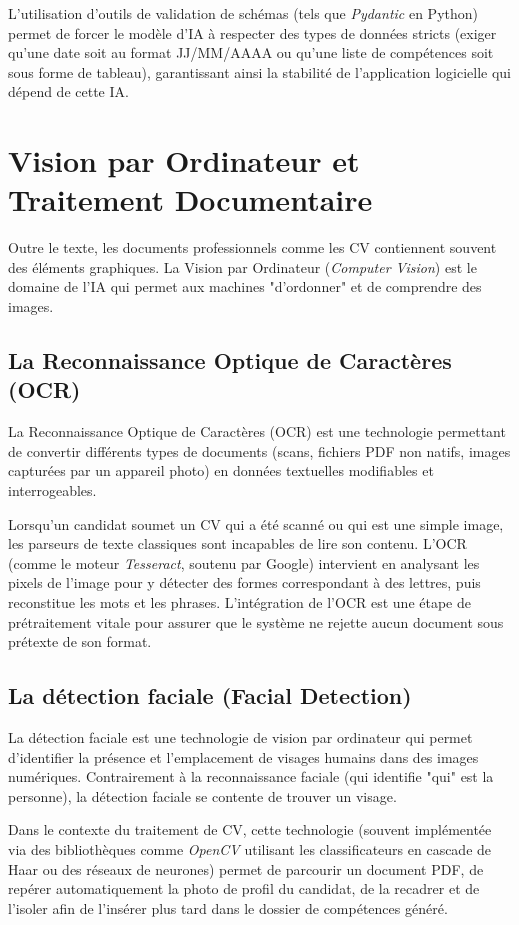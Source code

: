 L'utilisation d'outils de validation de schémas (tels que \textit{Pydantic} en Python) permet de forcer le modèle d'IA à respecter des types de données stricts (exiger qu'une date soit au format JJ/MM/AAAA ou qu'une liste de compétences soit sous forme de tableau), garantissant ainsi la stabilité de l'application logicielle qui dépend de cette IA.


\section{Vision par Ordinateur et Traitement Documentaire}

Outre le texte, les documents professionnels comme les CV contiennent souvent des éléments graphiques. La Vision par Ordinateur (\textit{Computer Vision}) est le domaine de l'IA qui permet aux machines "d'ordonner" et de comprendre des images.

\subsection{La Reconnaissance Optique de Caractères (OCR)}
La Reconnaissance Optique de Caractères (OCR) est une technologie permettant de convertir différents types de documents (scans, fichiers PDF non natifs, images capturées par un appareil photo) en données textuelles modifiables et interrogeables. 

Lorsqu'un candidat soumet un CV qui a été scanné ou qui est une simple image, les parseurs de texte classiques sont incapables de lire son contenu. L'OCR (comme le moteur \textit{Tesseract}, soutenu par Google) intervient en analysant les pixels de l'image pour y détecter des formes correspondant à des lettres, puis reconstitue les mots et les phrases. L'intégration de l'OCR est une étape de prétraitement vitale pour assurer que le système ne rejette aucun document sous prétexte de son format.

\subsection{La détection faciale (Facial Detection)}
La détection faciale est une technologie de vision par ordinateur qui permet d'identifier la présence et l'emplacement de visages humains dans des images numériques. Contrairement à la reconnaissance faciale (qui identifie "qui" est la personne), la détection faciale se contente de trouver un visage.

Dans le contexte du traitement de CV, cette technologie (souvent implémentée via des bibliothèques comme \textit{OpenCV} utilisant les classificateurs en cascade de Haar ou des réseaux de neurones) permet de parcourir un document PDF, de repérer automatiquement la photo de profil du candidat, de la recadrer et de l'isoler afin de l'insérer plus tard dans le dossier de compétences généré.

